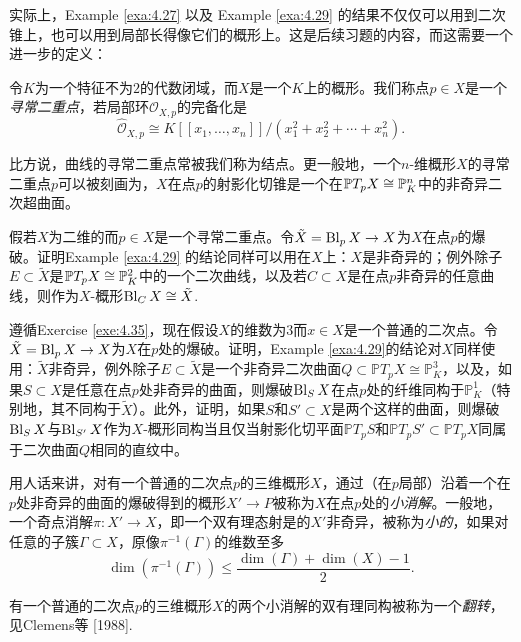 实际上，Example \ref{exa:4.27} 以及 Example \ref{exa:4.29} 的结果不仅仅可以用到二次锥上，也可以用到局部长得像它们的概形上。这是后续习题的内容，而这需要一个进一步的定义：

\begin{defi}\label{defi:4.34}
	令$K$为一个特征不为$2$的代数闭域，而$X$是一个$K$上的概形。我们称点$p\in X$是一个\textit{寻常二重点}，若局部环$\mathscr O_{X,p}$的完备化是
	\[
		\hat{\mathscr O}_{X,p}\cong K[\![x_1,\dots,x_n]\!]/(x_1^2+x_2^2+\cdots+x_n^2).
	\]
\end{defi}


比方说，曲线的寻常二重点常被我们称为结点。更一般地，一个$n$-维概形$X$的寻常二重点$p$可以被刻画为，$X$在点$p$的射影化切锥是一个在$\mathbb{P} T_pX\cong \mathbb{P}_K^n$中的非奇异二次超曲面。

\begin{exe}\label{exe:4.35}
	假若$X$为二维的而$p\in X$是一个寻常二重点。令$\tilde X=\operatorname{Bl}_p X\to X$为$X$在点$p$的爆破。证明Example \ref{exa:4.29} 的结论同样可以用在$X$上：$X$是非奇异的；例外除子$E\subset \tilde X$是$\mathbb{P} T_pX\cong \mathbb{P}_K^2$中的一个二次曲线，以及若$C\subset X$是在点$p$非奇异的任意曲线，则作为$X$-概形$\operatorname{Bl}_C X\cong \tilde X$.
\end{exe}

\begin{exe}\label{exe:4.36}
	遵循Exercise \ref{exe:4.35}，现在假设$X$的维数为$3$而$x\in X$是一个普通的二次点。令$\tilde X=\operatorname{Bl}_p X\to X$为$X$在$p$处的爆破。证明，Example \ref{exa:4.29}的结论对$X$同样使用：$\tilde X$非奇异，例外除子$E\subset \tilde X$是一个非奇异二次曲面$Q\subset \mathbb PT_pX\cong \mathbb P_K^3$，以及，如果$S\subset X$是任意在点$p$处非奇异的曲面，则爆破$\operatorname{Bl}_SX$在点$p$处的纤维同构于$\mathbb P_K^1$（特别地，其不同构于$\tilde X$）。此外，证明，如果$S$和$S'\subset X$是两个这样的曲面，则爆破$\operatorname{Bl}_SX$与$\operatorname{Bl}_{S'}X$作为$X$-概形同构当且仅当射影化切平面$\mathbb PT_pS$和$\mathbb PT_pS'\subset \mathbb PT_pX$同属于二次曲面$Q$相同的直纹中。
\end{exe}

用人话来讲，对有一个普通的二次点$p$的三维概形$X$，通过（在$p$局部）沿着一个在$p$处非奇异的曲面的爆破得到的概形$X'\to P$被称为$X$在点$p$处的\textit{小消解}。一般地，一个奇点消解$\pi:X'\to X$，即一个双有理态射是的$X'$非奇异，被称为\textit{小的}，如果对任意的子簇$\Gamma\subset X$，原像$\pi^{-1}(\Gamma)$的维数至多
\[
	\dim (\pi^{-1}(\Gamma))\leq \frac{\dim(\Gamma)+\dim(X)-1}2 .
\]

有一个普通的二次点$p$的三维概形$X$的两个小消解的双有理同构被称为一个\textit{翻转}，见Clemens等 [1988].

